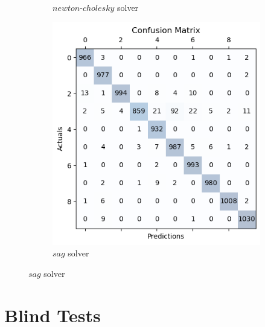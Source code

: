 \documentclass{article}
\begin{document}
\begin{titlepage}
\begin{figure}[htbp]
\begin{subfigure}[t]{0.3\linewidth}
      \caption{$newton$-$cholesky$ solver}
      \label{fig:sample6d}
    \end{subfigure}
    \hfill
    \begin{subfigure}[t]{0.3\linewidth}
      \includegraphics[width=\linewidth]{LRMC(sag).png}
      \caption{$sag$ solver}
      \label{fig:sample6f}
    \end{subfigure}
  \end{figure}

  \section*{Blind Tests}
  

\end{titlepage}
\end{document}
